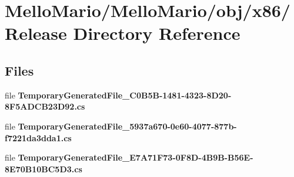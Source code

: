 \section{Mello\+Mario/\+Mello\+Mario/obj/x86/\+Release Directory Reference}
\label{dir_d77ae5ede7f7284afdc0e63eb523f625}
\subsection*{Files}
\begin{DoxyCompactItemize}
\item 
file \textbf{ Temporary\+Generated\+File\+\_\+C0\+B5\+B-\/1481-\/4323-\/8\+D20-\/8\+F5\+A\+D\+C\+B23\+D92.\+cs}
\item 
file \textbf{ Temporary\+Generated\+File\+\_\+5937a670-\/0e60-\/4077-\/877b-\/f7221da3dda1.\+cs}
\item 
file \textbf{ Temporary\+Generated\+File\+\_\+\+E7\+A71\+F73-\/0\+F8\+D-\/4\+B9\+B-\/\+B56\+E-\/8\+E70\+B10\+B\+C5\+D3.\+cs}
\end{DoxyCompactItemize}

